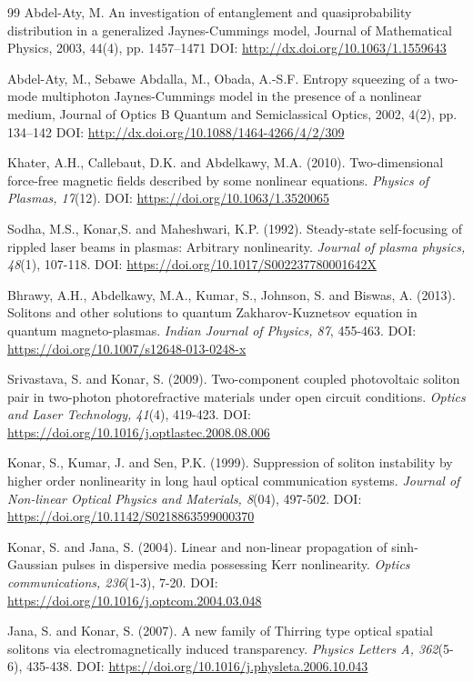 \documentclass[10pt]{NSP1}
\numberwithin{equation}{section}
\begin{document}
\begin{thebibliography}{99}
 Abdel-Aty, M.
An investigation of entanglement and quasiprobability distribution in a generalized Jaynes-Cummings model, Journal of Mathematical Physics, 2003, 44(4), pp. 1457--1471 DOI: \url{http://dx.doi.org/10.1063/1.1559643}

 Abdel-Aty, M., Sebawe Abdalla, M., Obada, A.-S.F.
Entropy squeezing of a two-mode multiphoton Jaynes-Cummings model in the presence of a nonlinear medium, Journal of Optics B Quantum and Semiclassical Optics, 2002, 4(2), pp. 134--142 DOI: \url{http://dx.doi.org/10.1088/1464-4266/4/2/309}

 Khater, A.H., Callebaut, D.K. and Abdelkawy, M.A. (2010). Two-dimensional force-free magnetic fields described by some nonlinear equations. \emph{Physics of Plasmas, 17}(12). DOI: \url{https://doi.org/10.1063/1.3520065}

 Sodha, M.S., Konar,S. and Maheshwari, K.P. (1992). Steady-state self-focusing of rippled laser beams in plasmas: Arbitrary nonlinearity. \emph{Journal of plasma physics, 48}(1), 107-118. DOI: \url{https://doi.org/10.1017/S002237780001642X}

 Bhrawy, A.H., Abdelkawy, M.A., Kumar, S., Johnson, S. and Biswas, A. (2013). Solitons and other solutions to quantum Zakharov-Kuznetsov equation in quantum magneto-plasmas. \emph{Indian Journal of Physics, 87}, 455-463. DOI: \url{https://doi.org/10.1007/s12648-013-0248-x}

 Srivastava, S. and Konar, S. (2009). Two-component coupled photovoltaic soliton pair in two-photon photorefractive materials under open circuit conditions. \emph{Optics and Laser Technology, 41}(4), 419-423. DOI: \url{https://doi.org/10.1016/j.optlastec.2008.08.006}

 Konar, S., Kumar, J. and Sen, P.K. (1999). Suppression of soliton instability by higher order nonlinearity in long haul optical communication systems. \emph{Journal of Non-linear Optical Physics and Materials, 8}(04), 497-502. DOI: \url{https://doi.org/10.1142/S0218863599000370}

 Konar, S. and Jana, S. (2004). Linear and non-linear propagation of sinh-Gaussian pulses in dispersive media possessing Kerr nonlinearity. \emph{Optics communications, 236}(1-3), 7-20. DOI: \url{https://doi.org/10.1016/j.optcom.2004.03.048}

 Jana, S. and Konar, S. (2007). A new family of Thirring type optical spatial solitons via electromagnetically induced transparency. \emph{Physics Letters A, 362}(5-6), 435-438. DOI: \url{https://doi.org/10.1016/j.physleta.2006.10.043}


\end{thebibliography}
\end{document}
